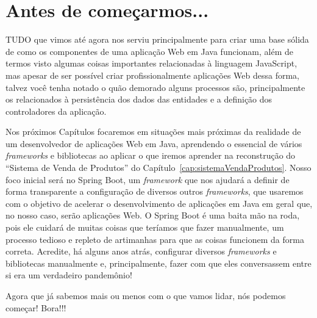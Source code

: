 \chapter*{Antes de começarmos...}

\lettrine[lines=4, lhang=0.1, lraise=0, loversize=0.2, findent=0.1em]{\textcolor{corTema}{T}}{UDO} que vimos até agora nos serviu principalmente para criar uma base sólida de como os componentes de uma aplicação Web em Java funcionam, além de termos visto algumas coisas importantes relacionadas à linguagem JavaScript, mas apesar de ser possível criar profissionalmente aplicações Web dessa forma, talvez você tenha notado o quão demorado alguns processos são, principalmente os relacionados à persistência dos dados das entidades e a definição dos controladores da aplicação.

Nos próximos Capítulos focaremos em situações mais próximas da realidade de um desenvolvedor de aplicações Web em Java, aprendendo o essencial de vários \textit{frameworks} e bibliotecas ao aplicar o que iremos aprender na reconstrução do ``Sistema de Venda de Produtos'' do Capítulo~\ref{cap:sistemaVendaProdutos}. Nosso foco inicial será no Spring Boot, um \textit{framework} que nos ajudará a definir de forma transparente a configuração de diversos outros \textit{frameworks}, que usaremos com o objetivo de acelerar o desenvolvimento de aplicações em Java em geral que, no nosso caso, serão aplicações Web. O Spring Boot é uma baita mão na roda, pois ele cuidará de muitas coisas que teríamos que fazer manualmente, um processo tedioso e repleto de artimanhas para que as coisas funcionem da forma correta. Acredite, há alguns anos atrás, configurar diversos \textit{frameworks} e bibliotecas manualmente e, principalmente, fazer com que eles conversassem entre si era um verdadeiro pandemônio!

Agora que já sabemos mais ou menos com o que vamos lidar, nós podemos começar! Bora!!!
